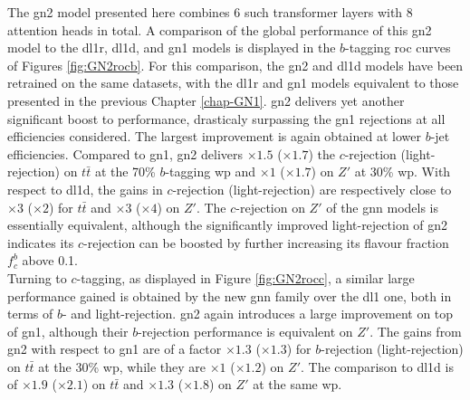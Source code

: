 The \gls{gn2} model presented here combines 6 such transformer layers with 8 attention heads in total. A comparison of the global performance of this \gls{gn2} model to the \gls{dl1r}, \gls{dl1d}, and \gls{gn1} models is displayed in the $b$-tagging \gls{roc} curves of Figures \ref{fig:GN2rocb}. For this comparison, the \gls{gn2} and \gls{dl1d} models have been retrained on the same datasets, with the \gls{dl1r} and \gls{gn1} models equivalent to those presented in the previous Chapter \ref{chap-GN1}. \gls{gn2} delivers yet another significant boost to performance, drasticaly surpassing the \gls{gn1} rejections at all efficiencies considered. The largest improvement is again obtained at lower $b$-jet efficiencies. Compared to \gls{gn1}, \gls{gn2} delivers $\times 1.5$ ($\times 1.7$) the $c$-rejection (light-rejection) on $t\bar{t}$ at the 70\% $b$-tagging \gls{wp} and $\times 1$ ($\times 1.7$) on $Z'$ at 30\% \gls{wp}. With respect to \gls{dl1d}, the gains in $c$-rejection (light-rejection) are respectively close to $\times 3$ ($\times 2$) for $t\bar{t}$ and $\times 3$ ($\times 4$) on $Z'$. The $c$-rejection on $Z'$ of the \gls{gnn} models is essentially equivalent, although the significantly improved light-rejection of \gls{gn2} indicates its $c$-rejection can be boosted by further increasing its flavour fraction $f^b_c$ above 0.1. \\

Turning to $c$-tagging, as displayed in Figure \ref{fig:GN2rocc}, a similar large performance gained is obtained by the new \gls{gnn} family over the \gls{dl1} one, both in terms of $b$- and light-rejection. \gls{gn2} again introduces a large improvement on top of \gls{gn1}, although their $b$-rejection performance is equivalent on $Z'$. The gains from \gls{gn2} with respect to \gls{gn1} are of a factor $\times 1.3$ ($\times 1.3$) for $b$-rejection (light-rejection) on $t\bar{t}$ at the 30\% \gls{wp}, while they are $\times 1$ ($\times 1.2$) on $Z'$. The comparison to \gls{dl1d} is of $\times 1.9$ ($\times 2.1$) on $t\bar{t}$ and $\times 1.3$ ($\times 1.8$) on $Z'$ at the same \gls{wp}.

